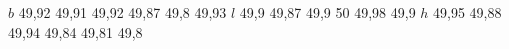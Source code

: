 $b$	49,92	49,91	49,92	49,87	49,8	49,93
$l$	49,9	49,87	49,9	50	49,98	49,9
$h$	49,95	49,88	49,94	49,84	49,81	49,8

